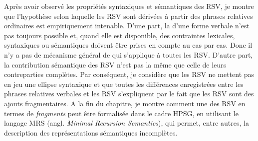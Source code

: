 Après avoir observé les propriétés syntaxiques et sémantiques des RSV, je montre que l’hypothèse selon laquelle les RSV sont dérivées à partir des phrases relatives ordinaires est empiriquement intenable. D’une part, la  d’une forme verbale n’est pas toujours possible et, quand elle est disponible, des contraintes lexicales, syntaxiques ou sémantiques doivent être prises en compte au cas par cas. Donc il n’y a pas de mécanisme général de  qui s’applique à toutes les RSV. D’autre part, la contribution sémantique des RSV n’est pas la même que celle de leurs contreparties complètes. Par conséquent, je considère que les RSV ne mettent pas en jeu une ellipse syntaxique et que toutes les différences enregistrées entre les phrases relatives verbales et les RSV s’expliquent par le fait que les RSV sont des ajouts fragmentaires. A la fin du chapitre, je montre comment une  des RSV en termes de \textit{fragments} peut être formalisée dans le cadre HPSG, en utilisant le langage MRS (angl. \textit{Minimal Recursion Semantics}), qui permet, entre autres, la description des représentations sémantiques incomplètes. 

 